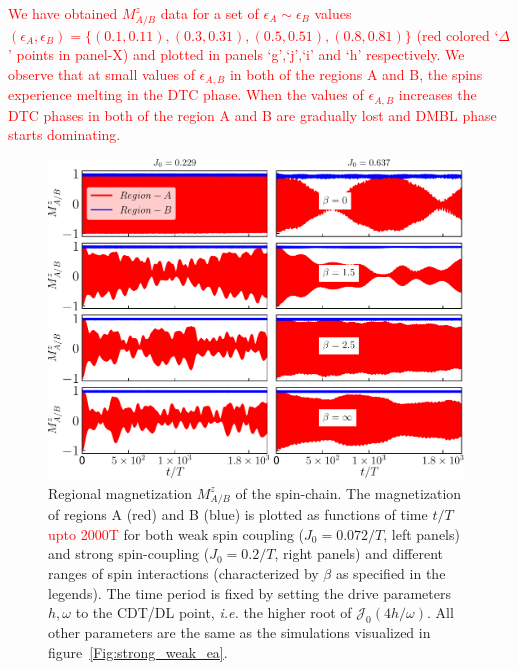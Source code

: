 \documentclass[12pt]{iopart}
\newcommand{\red}[1]{\textcolor{red}{#1}}
\begin{document}
\red{We have obtained $M^z_{A/B}$ data for a set of $\epsilon_A \sim \epsilon_B$ values $(\epsilon_{A},\epsilon_{B}) = \{(0.1,0.11), (0.3,0.31),(0.5,0.51),(0.8,0.81)\}$ (red colored `$\Delta$' points in panel-X) and plotted in panels `g',`j',`i' and `h' respectively. We observe that at small values of $\epsilon_{A,B}$ in both of the regions A and B, the spins experience melting in the DTC phase. When the values of $\epsilon_{A,B}$ increases the DTC phases in both of the region A and B are gradually lost and DMBL phase starts dominating.}
\begin{figure}[t]
	\centering
	\hspace{1.5cm}\includegraphics[width = 11cm]{figure9.pdf}
	\caption{Regional magnetization $M^z_{A/B}$ of the spin-chain. The magnetization of regions A (red) and B (blue) is plotted as functions of time $t/T$ \red{upto 2000T} for both weak spin coupling ($J_0=0.072/T$, left panels) and strong spin-coupling ($J_0=0.2/T$, right panels) and different ranges of spin interactions (characterized by $\beta$ as specified in the legends). The time period is fixed by setting the drive parameters $h,\omega$ to the CDT/DL point, \textit{i.e.} the higher root of $\mathcal{J}_0(4h/\omega)$. All other parameters are the same as the simulations visualized in figure~\ref{Fig:strong_weak_ea}.}
	\label{Fig:regiogionalmag}
\end{figure}
\end{document}

